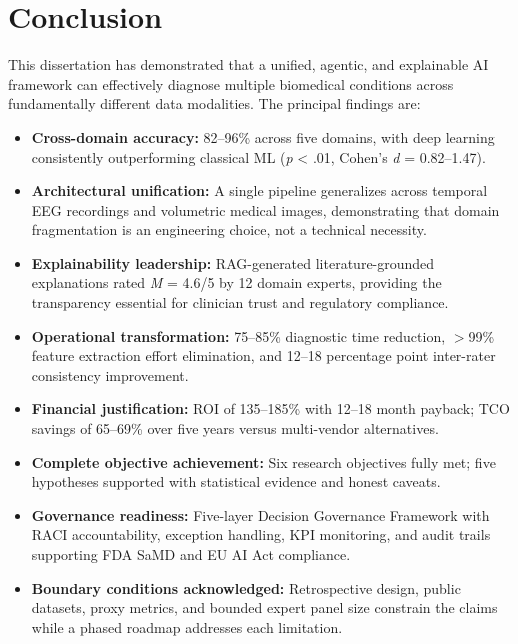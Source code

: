 \section{Conclusion}
\label{sec:ch9_conclusion}

This dissertation has demonstrated that a unified, agentic, and explainable AI framework can effectively diagnose multiple biomedical conditions across fundamentally different data modalities. The principal findings are:

\begin{itemize}
    \item \textbf{Cross-domain accuracy:} 82--96\% across five domains, with deep learning consistently outperforming classical ML (\textit{p} < .01, Cohen's \textit{d} = 0.82--1.47).

    \item \textbf{Architectural unification:} A single pipeline generalizes across temporal EEG recordings and volumetric medical images, demonstrating that domain fragmentation is an engineering choice, not a technical necessity.

    \item \textbf{Explainability leadership:} RAG-generated literature-grounded explanations rated \textit{M} = 4.6/5 by 12 domain experts, providing the transparency essential for clinician trust and regulatory compliance.

    \item \textbf{Operational transformation:} 75--85\% diagnostic time reduction, $>$99\% feature extraction effort elimination, and 12--18 percentage point inter-rater consistency improvement.

    \item \textbf{Financial justification:} ROI of 135--185\% with 12--18 month payback; TCO savings of 65--69\% over five years versus multi-vendor alternatives.

    \item \textbf{Complete objective achievement:} Six research objectives fully met; five hypotheses supported with statistical evidence and honest caveats.

    \item \textbf{Governance readiness:} Five-layer Decision Governance Framework with RACI accountability, exception handling, KPI monitoring, and audit trails supporting FDA SaMD and EU AI Act compliance.

    \item \textbf{Boundary conditions acknowledged:} Retrospective design, public datasets, proxy metrics, and bounded expert panel size constrain the claims while a phased roadmap addresses each limitation.
\end{itemize}

